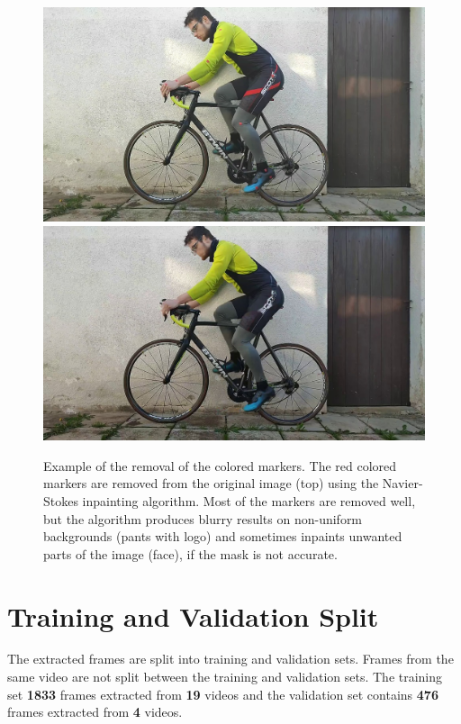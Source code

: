 \begin{figure}
    \includegraphics[width=1\linewidth]{obrazky-figures/inpainting_original.png}
    \includegraphics[width=1\linewidth]{obrazky-figures/inpainting.jpg}
    \caption{Example of the removal of the colored markers. The red colored markers are removed from the original image (top) using the Navier-Stokes inpainting algorithm. Most of the markers are removed well, but the algorithm produces blurry results on non-uniform backgrounds (pants with logo) and sometimes inpaints unwanted parts of the image (face), if the mask is not accurate.}
    \label{fig:inpainting}
\end{figure}


\section{Training and Validation Split}
\label{evaluation_dataset}
The extracted frames are split into training and validation sets. Frames from the same video are not split between the training and validation sets. The training set \textbf{1833} frames extracted from \textbf{19} videos and the validation set contains \textbf{476} frames extracted from \textbf{4} videos.





